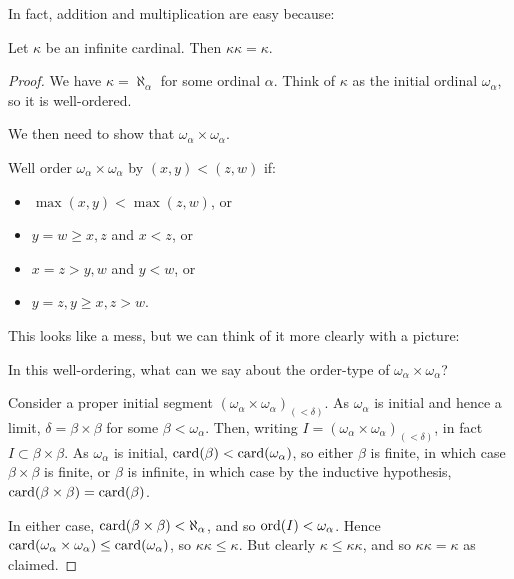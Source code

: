 \documentclass[10pt,a4paper]{article}
\begin{document}
In fact, addition and multiplication are easy because:
\begin{proposition}
Let $\kappa$ be an infinite cardinal. Then $\kappa\kappa =\kappa$.
\end{proposition}
\begin{proof}
We have $\kappa = \aleph_\alpha$ for some ordinal $\alpha$. Think of $\kappa$ as the initial ordinal $\omega_\alpha$, so it is well-ordered.

We then need to show that $\omega_\alpha \times \omega_\alpha$.

Well order $\omega_\alpha \times \omega_\alpha$ by $(x,y) < (z,w)$ if:
\begin{itemize}
\item $\max(x,y) < \max(z,w)$, or
\item $y = w \geq x,z$ and $ x < z$, or
\item $x = z > y,w$ and $y < w$, or
\item $y = z, y \geq x, z > w$.
\end{itemize}
This looks like a mess, but we can think of it more clearly with a picture:
\begin{figure}[H]
\centering
{}
\end{figure}
In this well-ordering, what can we say about the order-type of $\omega_\alpha\times\omega_\alpha$?

Consider a proper initial segment $(\omega_\alpha \times \omega_\alpha)_{(<\delta)}$. As $\omega_\alpha$ is initial and hence a limit, $\delta = \beta \times \beta$ for some $\beta < \omega_\alpha$. Then, writing $I = (\omega_\alpha \times \omega_\alpha)_{(<\delta)}$, in fact $I \subset \beta \times \beta$. As $\omega_\alpha$ is initial, $\operatorname{card}(\beta) < \operatorname{card}(\omega_\alpha)$, so either $\beta$ is finite, in which case $\beta \times \beta$ is finite, or $\beta$ is infinite, in which case by the inductive hypothesis, $\operatorname{card}(\beta \times \beta) = \operatorname{card}(\beta)$.

In either case, $\operatorname{card}(\beta \times \beta) < \aleph_\alpha$, and so $\operatorname{ord}(I) < \omega_\alpha$. Hence $\operatorname{card}(\omega_\alpha\times\omega_\alpha) \leq \operatorname{card}(\omega_\alpha)$, so $\kappa\kappa \leq\kappa$. But clearly $\kappa \leq \kappa\kappa$, and so $\kappa\kappa = \kappa$ as claimed.
\end{proof}
\end{document}
